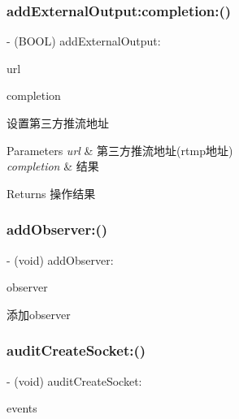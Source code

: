 \subsubsection{\texorpdfstring{add\+External\+Output\+:completion\+:()}{addExternalOutput:completion:()}}
{\footnotesize\ttfamily -\/ (B\+O\+OL) add\+External\+Output\+: \begin{DoxyParamCaption}\item[{(N\+S\+String $\ast$)}]{url }\item[{completion:(C\+C\+Comletion\+Block)}]{completion }\end{DoxyParamCaption}}

设置第三方推流地址 
\begin{DoxyParams}{Parameters}
{\em url} & 第三方推流地址(rtmp地址) \\
\hline
{\em completion} & 结果 \\
\hline
\end{DoxyParams}
\begin{DoxyReturn}{Returns}
操作结果 
\end{DoxyReturn}
\mbox{\label{interface_c_c_streamer_basic_ad25d3d5930be6f375133272c6ff30324}} 
\subsubsection{\texorpdfstring{add\+Observer\+:()}{addObserver:()}}
{\footnotesize\ttfamily -\/ (void) add\+Observer\+: \begin{DoxyParamCaption}\item[{(id$<$ C\+C\+Streamer\+Basic\+Delegate $>$)}]{observer }\end{DoxyParamCaption}}

添加observer \mbox{\label{interface_c_c_streamer_basic_ad0107408438386061abe80c874918287}} 
\subsubsection{\texorpdfstring{audit\+Create\+Socket\+:()}{auditCreateSocket:()}}
{\footnotesize\ttfamily -\/ (void) audit\+Create\+Socket\+: \begin{DoxyParamCaption}\item[{(N\+S\+Array $\ast$)}]{events }\end{DoxyParamCaption}}

